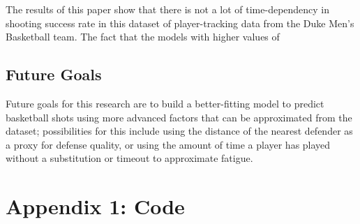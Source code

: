 \documentclass[12pt,twoside]{dukestatscithesis}
\theoremstyle{definition}
\theoremstyle{definition}
\theoremstyle{definition}
\theoremstyle{remark}
\begin{document}
The results of this paper show that there is not a lot of
time-dependency in shooting success rate in this dataset of
player-tracking data from the Duke Men's Basketball team. The fact that
the models with higher values of

\section{Future Goals}\label{future-goals}

Future goals for this research are to build a better-fitting model to
predict basketball shots using more advanced factors that can be
approximated from the dataset; possibilities for this include using the
distance of the nearest defender as a proxy for defense quality, or
using the amount of time a player has played without a substitution or
timeout to approximate fatigue.

\appendix

\chapter{Appendix 1: Code}\label{appendix-1-code}
\end{document}
